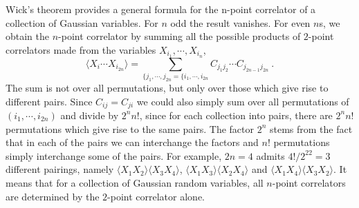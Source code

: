 \documentclass[12pt,a4paper]{article}
\begin{document}
Wick's theorem provides a general formula for the n-point correlator of a collection of Gaussian variables. For $n$ odd the result vanishes. For even $n$s, we obtain the $n$-point correlator by summing all the possible products of $2$-point correlators made from the variables $X_{i_1}, \cdots , X_{i_n}$,
\begin{equation}
\langle X_i \cdots X_{i_{2n}} \rangle  = \sum_{\{j_1, \cdots, j_{2n} = \{i_1, \cdots, i_{2n}} C_{j_1 j_2 }\cdots C_{j_{2n-1}j_{2n}} ~.
\end{equation}
The sum is not over all permutations, but only over those which give rise to different pairs. Since $C_{ij} = C_{ji}$ we could also simply sum over all permutations of $(i_1, \cdots, i_{2n})$ and divide by $2^n n!$, since for each collection into pairs, there are $2^n n!$ permutations which give rise to the same pairs. The factor $2^n$ stems from the fact that in each of the pairs we can interchange the factors and $n!$ permutations simply interchange some of the pairs. For example, $2n = 4$ admits $4!/2^22 = 3$ different pairings, namely $\langle X_1 X_2\rangle \langle X_3 X_4\rangle$, $\langle X_1 X_3\rangle \langle X_2 X_4\rangle$ and $\langle X_1 X_4\rangle \langle X_3 X_2\rangle$. It means that for a collection of Gaussian random variables, all $n$-point correlators are determined by the $2$-point correlator alone.
\end{document}
